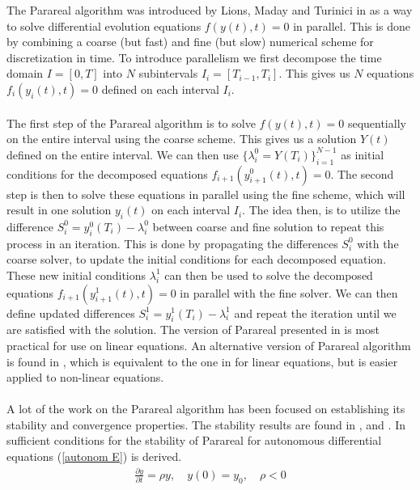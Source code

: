 The Parareal algorithm was introduced by Lions, Maday and Turinici in \cite{lions2001resolution} as a way to solve differential evolution equations $f(y(t),t)=0$ in parallel. This is done by combining a coarse (but fast) and fine (but slow) numerical scheme for discretization in time. To introduce parallelism we first decompose the time domain $I=[0,T]$ into $N$ subintervals $I_i=[T_{i-1},T_i]$. This gives us $N$ equations $f_i(y_i(t),t)=0$ defined on each interval $I_i$. 
\\
\\
The first step of the Parareal algorithm is to solve $f(y(t),t)=0$ sequentially on the entire interval using the coarse scheme. This gives us a solution $Y(t)$ defined on the entire interval. We can then use $\{\lambda_i^0=Y(T_i)\}_{i=1}^{N-1}$ as initial conditions for the decomposed equations $f_{i+1}(y_{i+1}^0(t),t)=0$. The second step is then to solve these equations in parallel using the fine scheme, which will result in one solution $y_i(t)$ on each interval $I_i$. The idea then, is to utilize the difference $S_i^0=y_i^0(T_{i})-\lambda_i^0$ between coarse and fine solution to repeat this process in an iteration. This is done by propagating the differences $S_i^0$ with the coarse solver, to update the initial conditions for each decomposed equation. These new initial conditions $\lambda_i^1$ can then be used to solve the decomposed equations $f_{i+1}(y_{i+1}^1(t),t)=0$ in parallel with the fine solver. We can then define updated differences $S_i^1=y_i^1(T_{i})-\lambda_i^1$ and repeat the iteration until we are satisfied with the solution. The version of Parareal presented in \cite{lions2001resolution} is most practical for use on linear equations. An alternative version of Parareal algorithm is found in \cite{baffico2002parallel}, which is equivalent to the one in \cite{lions2001resolution} for linear equations, but is easier applied to non-linear equations.
\\
\\
A lot of the work on the Parareal algorithm has been focused on establishing its stability and convergence properties. The stability results are found in \cite{staff2005stability},\cite{maday2007parareal} and \cite{bal2005convergence}. In \cite{staff2005stability,maday2007parareal} sufficient conditions for the stability of Parareal for autonomous differential equations (\ref{autonom E}) is derived.
\begin{align}
\frac{\partial y}{\partial t} =\rho y,\quad y(0)=y_0,\quad  \rho<0 \label{autonom E}
\end{align}
